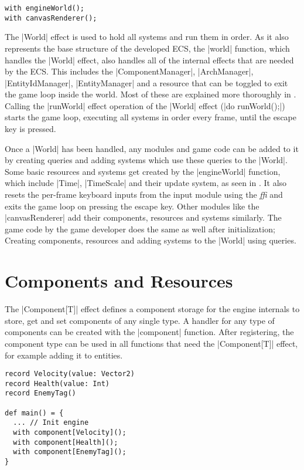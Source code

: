 \begin{lstlisting}
with engineWorld();
with canvasRenderer();
\end{lstlisting}

The |World| effect is used to hold all systems and run them in order. As it also represents the base structure of the developed ECS, the |world| function, which handles the |World| effect, also handles all of the internal effects that are needed by the ECS. This includes the |ComponentManager|, |ArchManager|, |EntityIdManager|, |EntityManager| and a resource that can be toggled to exit the game loop inside the world. Most of these are explained more thoroughly in . Calling the |runWorld| effect operation of the |World| effect (|do runWorld();|) starts the game loop, executing all systems in order every frame, until the escape key is pressed.

Once a |World| has been handled, any modules and game code can be added to it by creating queries and adding systems which use these queries to the |World|. Some basic resources and systems get created by the |engineWorld| function, which include |Time|, |TimeScale| and their update system, as seen in . It also resets the per-frame keyboard inputs from the input module using the \textit{ffi} and exits the game loop on pressing the escape key. Other modules like the |canvasRenderer| add their components, resources and systems similarly. The game code by the game developer does the same as well after initialization; Creating components, resources and adding systems to the |World| using queries.

\section{Components and Resources}

The |Component[T]| effect defines a component storage for the engine internals to store, get and set components of any single type. A handler for any type of components can be created with the |component| function. After registering, the component type can be used in all functions that need the |Component[T]| effect, for example adding it to entities.

\begin{lstlisting}
record Velocity(value: Vector2)
record Health(value: Int)
record EnemyTag()

def main() = {
  ... // Init engine
  with component[Velocity]();
  with component[Health]();
  with component[EnemyTag]();
}
\end{lstlisting}

